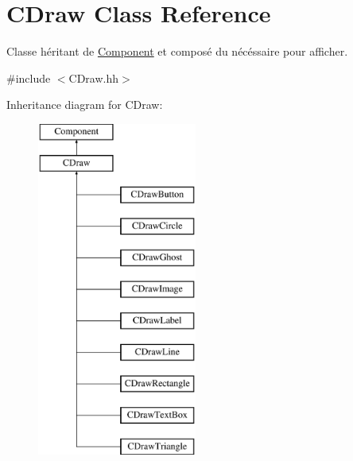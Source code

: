 \hypertarget{class_c_draw}{}\section{C\+Draw Class Reference}
\label{class_c_draw}


Classe héritant de \hyperlink{class_component}{Component} et composé du nécéssaire pour afficher.  




{\ttfamily \#include $<$C\+Draw.\+hh$>$}

Inheritance diagram for C\+Draw\+:\begin{figure}[H]
\begin{center}
\leavevmode
\includegraphics[height=11.000000cm]{class_c_draw}
\end{center}
\end{figure}
